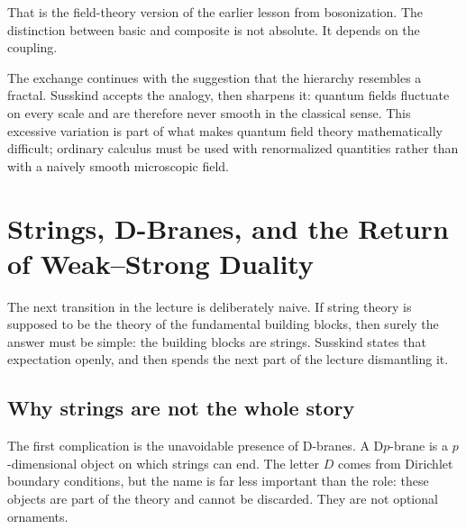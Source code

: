 That is the field-theory version of the earlier lesson from bosonization. The distinction between basic and composite is not absolute. It depends on the coupling.

\begin{classroomqa}
\end{classroomqa}

The exchange continues with the suggestion that the hierarchy resembles a fractal. Susskind accepts the analogy, then sharpens it: quantum fields fluctuate on every scale and are therefore never smooth in the classical sense. This excessive variation is part of what makes quantum field theory mathematically difficult; ordinary calculus must be used with renormalized quantities rather than with a naively smooth microscopic field.

\section{Strings, D-Branes, and the Return of Weak--Strong Duality}

The next transition in the lecture is deliberately naive. If string theory is supposed to be the theory of the fundamental building blocks, then surely the answer must be simple: the building blocks are strings. Susskind states that expectation openly, and then spends the next part of the lecture dismantling it.

\subsection{Why strings are not the whole story}

The first complication is the unavoidable presence of D-branes. A D\(p\)-brane is a \(p\)-dimensional object on which strings can end. The letter \(D\) comes from Dirichlet boundary conditions, but the name is far less important than the role: these objects are part of the theory and cannot be discarded. They are not optional ornaments.

